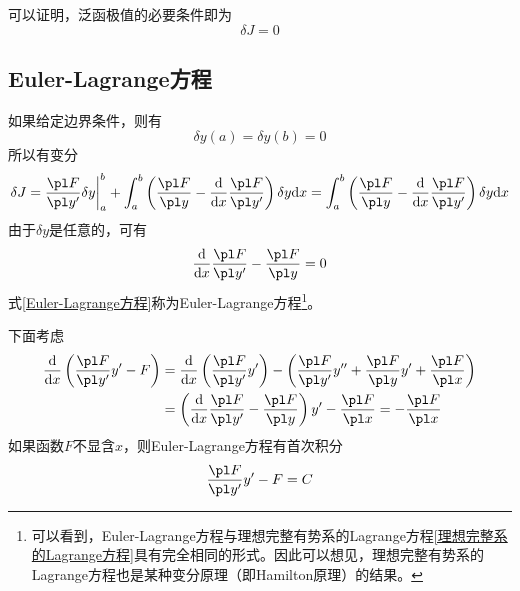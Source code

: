 可以证明，泛函极值的必要条件即为
\begin{equation}
	\delta J = 0
\end{equation}

\subsection{Euler-Lagrange方程}

如果给定边界条件，则有
\begin{equation}
	\delta y(a) = \delta y(b) = 0
	\label{变分问题边界条件}
\end{equation}
所以有变分
\begin{equation*}
	\delta J = \frac{\pl F}{\pl y'} \delta y \bigg|_a^b + \int_a^b \left(\frac{\pl F}{\pl y} - \frac{\mathrm{d}}{\mathrm{d} x} \frac{\pl F}{\pl y'}\right) \delta y \mathrm{d} x = \int_a^b \left(\frac{\pl F}{\pl y} - \frac{\mathrm{d}}{\mathrm{d} x} \frac{\pl F}{\pl y'}\right) \delta y \mathrm{d} x
\end{equation*}
由于$\delta y$是任意的，可有
\begin{equation}
	\frac{\mathrm{d}}{\mathrm{d} x} \frac{\pl F}{\pl y'} - \frac{\pl F}{\pl y} = 0
	\label{Euler-Lagrange方程}
\end{equation}
式\eqref{Euler-Lagrange方程}称为{\heiti Euler-Lagrange方程}\footnote{可以看到，Euler-Lagrange方程与理想完整有势系的Lagrange方程\eqref{理想完整系的Lagrange方程}具有完全相同的形式。因此可以想见，理想完整有势系的Lagrange方程也是某种变分原理（即{\heiti Hamilton原理}）的结果。}。

下面考虑
\begin{align*}
	\frac{\mathrm{d}}{\mathrm{d} x} \left(\frac{\pl F}{\pl y'} y' - F\right) & = \frac{\mathrm{d}}{\mathrm{d} x} \left(\frac{\pl F}{\pl y'}y'\right) - \left(\frac{\pl F}{\pl y'} y'' + \frac{\pl F}{\pl y} y' + \frac{\pl F}{\pl x}\right) \\
	& = \left(\frac{\mathrm{d}}{\mathrm{d} x} \frac{\pl F}{\pl y'} - \frac{\pl F}{\pl y}\right) y' - \frac{\pl F}{\pl x} = -\frac{\pl F}{\pl x}
\end{align*}
如果函数$F$不显含$x$，则Euler-Lagrange方程有首次积分
\begin{equation}
	\frac{\pl F}{\pl y'}y' - F = C
\end{equation}

